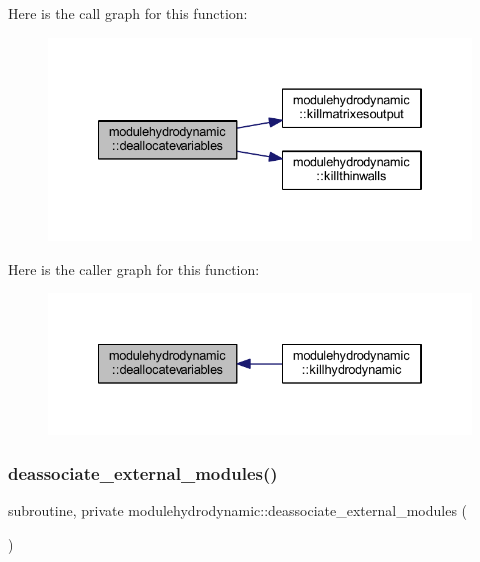 Here is the call graph for this function\+:\nopagebreak
\begin{figure}[H]
\begin{center}
\leavevmode
\includegraphics[width=334pt]{namespacemodulehydrodynamic_a97e376130dedc4213ae9f7bd331d237a_cgraph}
\end{center}
\end{figure}
Here is the caller graph for this function\+:\nopagebreak
\begin{figure}[H]
\begin{center}
\leavevmode
\includegraphics[width=334pt]{namespacemodulehydrodynamic_a97e376130dedc4213ae9f7bd331d237a_icgraph}
\end{center}
\end{figure}
\mbox{\label{namespacemodulehydrodynamic_a9ab4535ec430fb9f040e8027eab7128d}} 
\subsubsection{\texorpdfstring{deassociate\+\_\+external\+\_\+modules()}{deassociate\_external\_modules()}}
{\footnotesize\ttfamily subroutine, private modulehydrodynamic\+::deassociate\+\_\+external\+\_\+modules (\begin{DoxyParamCaption}{ }\end{DoxyParamCaption})\hspace{0.3cm}{\ttfamily [private]}}


